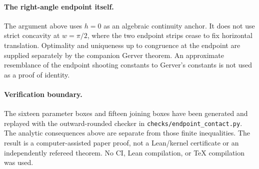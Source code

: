 \documentclass[11pt]{article}
\begin{document}
\paragraph{The right-angle endpoint itself.}
The argument above uses $h=0$ as an algebraic continuity anchor. It does not use strict concavity at $w=\pi/2$, where the two endpoint strips cease to fix horizontal translation. Optimality and uniqueness up to congruence at the endpoint are supplied separately by the companion Gerver theorem. An approximate resemblance of the endpoint shooting constants to Gerver's constants is not used as a proof of identity.

\paragraph{Verification boundary.}
The sixteen parameter boxes and fifteen joining boxes have been generated and replayed with the outward-rounded checker in \texttt{checks/endpoint\_contact.py}. The analytic consequences above are separate from those finite inequalities. The result is a computer-assisted paper proof, not a Lean/kernel certificate or an independently refereed theorem. No CI, Lean compilation, or TeX compilation was used.
\end{document}

